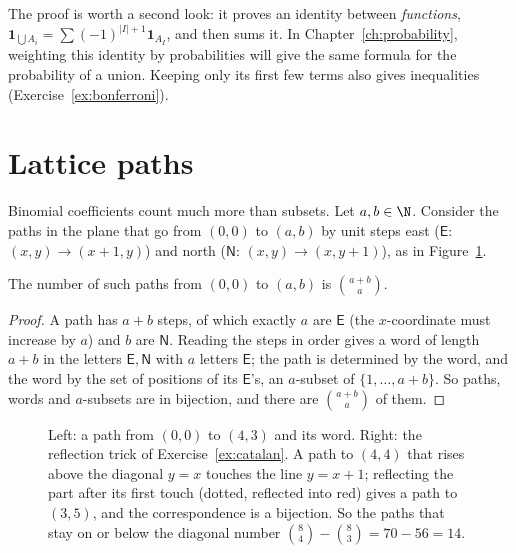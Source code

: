The proof is worth a second look: it proves an identity between \emph{functions}, $\mathbf 1_{\bigcup A_i}=\sum(-1)^{|I|+1}\mathbf 1_{A_I}$, and then sums it. In Chapter~\ref{ch:probability}, weighting this identity by probabilities will give the same formula for the probability of a union. Keeping only its first few terms also gives inequalities (Exercise~\ref{ex:bonferroni}).


\section{Lattice paths}

Binomial coefficients count much more than subsets. Let $a,b\in\N$. Consider the paths in the plane that go from $(0,0)$ to $(a,b)$ by unit steps east
($\mathsf E$: $(x,y)\to(x+1,y)$) and north ($\mathsf N$: $(x,y)\to(x,y+1)$), as in Figure~\ref{fig:paths}.

\begin{proposition}\label{prop:paths}
The number of such paths from $(0,0)$ to $(a,b)$ is $\binom{a+b}a$.
\end{proposition}
\begin{proof}
A path has $a+b$ steps, of which exactly $a$ are $\mathsf E$ (the $x$-coordinate must increase by $a$) and $b$ are $\mathsf N$. Reading the steps in
order gives a word of length $a+b$ in the letters $\mathsf E,\mathsf N$ with $a$ letters $\mathsf E$; the path is determined by the word, and the word by the set of positions of its
$\mathsf E$'s, an $a$-subset of $\{1,\dots,a+b\}$. So paths, words and $a$-subsets are in bijection, and there are $\binom{a+b}a$ of them.
\end{proof}

\begin{figure}[ht]
\centering
{}
\caption{Left: a path from $(0,0)$ to $(4,3)$ and its word. Right: the reflection trick of Exercise~\ref{ex:catalan}. A path to $(4,4)$ that rises above the diagonal $y=x$ touches the line $y=x+1$; reflecting the part after its first touch (dotted, reflected into red) gives a path to $(3,5)$, and the correspondence is a bijection. So the paths that stay on or below the diagonal number $\binom84-\binom83=70-56=14$.}
\label{fig:paths}
\end{figure}

